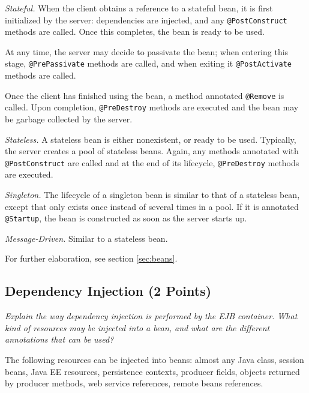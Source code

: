 \documentclass[a4paper,10pt]{article}
\begin{document}
\emph{Stateful.} When the client obtains a reference to a stateful bean, it is first
initialized by the server: dependencies are injected, and any \lstinline|@PostConstruct| methods
are called. Once this completes, the bean is ready to be used.

At any time, the server may decide to passivate the bean; when entering this stage,
\lstinline|@PrePassivate| methods are called, and when exiting it \lstinline|@PostActivate| methods
are called.

Once the client has finished using the bean, a method annotated \lstinline|@Remove| is called.
Upon completion, \lstinline|@PreDestroy| methods are executed and the bean may be garbage collected by the server.

\vspace{3mm}

\emph{Stateless.} A stateless bean is either nonexistent, or ready to be used. Typically, the server
creates a pool of stateless beans. Again, any methods annotated with \lstinline|@PostConstruct| are
called and at the end of its lifecycle, \lstinline|@PreDestroy| methods are executed.

\vspace{3mm}

\emph{Singleton.} The lifecycle of a singleton bean is similar to that of a stateless bean, except
that only exists once instead of several times in a pool. If it is annotated \lstinline|@Startup|,
the bean is constructed as soon as the server starts up.

\vspace{3mm}

\emph{Message-Driven.} Similar to a stateless bean.

\vspace{3mm}

For further elaboration, see section \ref{sec:beans}.

\subsection{Dependency Injection (2 Points)}

\emph{
Explain the way dependency injection is performed by the EJB container. What kind of resources may
be injected into a bean, and what are the different annotations that can be used?}

\vspace{3mm}


The following resources can be injected into beans: almost any Java class, session beans, 
Java EE resources, persistence contexts, producer fields, objects returned by producer methods,
web service references, remote beans references.
\end{document}
